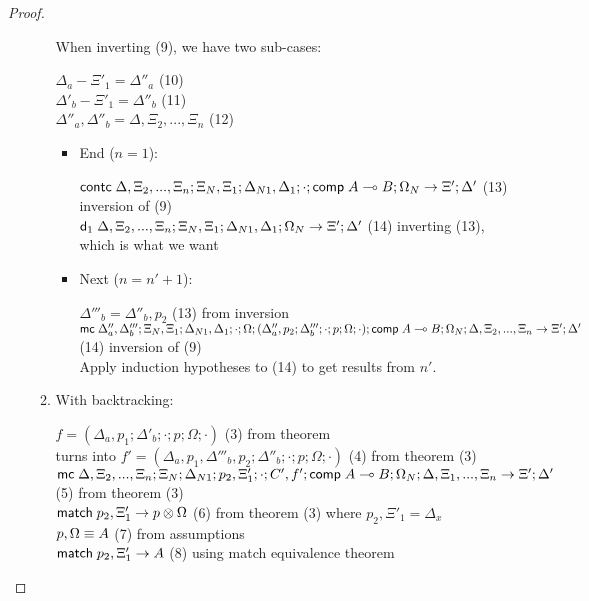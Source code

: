 \begin{proof}
\begin{itemize}
\begin{enumerate}
         When inverting (9), we have two sub-cases:
      
         $\Delta_a - \Xi'_1 = \Delta''_a$ \hfill (10) \\
         $\Delta'_b - \Xi'_1 = \Delta''_b$ \hfill (11) \\
         $\Delta''_a, \Delta''_b = \Delta, \Xi_2, ..., \Xi_n$ \hfill (12) \\
      
         \begin{itemize}
            \item End ($n = 1$):
         
            $\mathsf{contc} \; \Delta, \Xi_2, ..., \Xi_n; \Xi_N, \Xi_1; \Delta_{N1}, \Delta_1; \cdot; \mathsf{comp} \; A \multimap B; \Omega_N \rightarrow \Xi'; \Delta'$ \hfill (13) \hfill inversion of (9) \\
            $\mathsf{d}_1 \; \Delta, \Xi_2, ..., \Xi_n; \Xi_N, \Xi_1; \Delta_{N1}, \Delta_1; \Omega_N \rightarrow \Xi'; \Delta'$ \hfill (14) inverting (13), which is what we want \\
         
            \item Next ($n = n' + 1$):
         
            $\Delta'''_b = \Delta''_b, p_2$ \hfill (13) from inversion \\
            $\mathsf{mc} \; \Delta''_a, \Delta'''_b; \Xi_N, \Xi_1; \Delta_{N1}, \Delta_1; \cdot; \Omega; (\Delta''_a, p_2; \Delta'''_b; \cdot; p; \Omega; \cdot); \mathsf{comp} \; A \multimap B; \Omega_N; \Delta, \Xi_2, ..., \Xi_n \rightarrow \Xi'; \Delta'$ \hfill (14) inversion of (9) \\
            Apply induction hypotheses to (14) to get results from $n'$.\\ 
         \end{itemize}
      
         \item With backtracking:
   
         $f = (\Delta_a, p_1; \Delta'_b; \cdot; p; \Omega; \cdot)$ \hfill (3) from theorem \\
         turns into $f' = (\Delta_a, p_1, \Delta'''_b, p_2; \Delta''_b; \cdot; p; \Omega; \cdot)$ \hfill (4) from theorem (3) \\
         $\mathsf{mc} \; \Delta, \Xi_2, ..., \Xi_n; \Xi_N; \Delta_{N1}; p_2, \Xi'_1; \cdot; C', f'; \mathsf{comp} \; A \multimap B; \Omega_N; \Delta, \Xi_1, ..., \Xi_n \rightarrow \Xi'; \Delta'$ \hfill (5) from theorem (3) \\
         $\mathsf{match} \; p_2, \Xi'_1 \rightarrow p \otimes \Omega$ \hfill (6) from theorem (3) where $p_2, \Xi'_1 = \Delta_x$ \\
         $p, \Omega \equiv A$ \hfill (7) from assumptions \\
         $\mathsf{match} \; p_2, \Xi'_1 \rightarrow A$ \hfill (8) using match equivalence theorem \\
   

\end{enumerate}
\end{itemize}
\end{proof}
